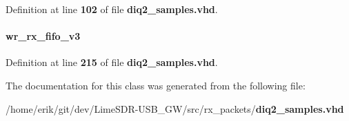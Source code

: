 Definition at line {\bf 102} of file {\bf diq2\+\_\+samples.\+vhd}.

\paragraph[{wr\+\_\+rx\+\_\+fifo\+\_\+v3\+\_\+inst}]{ {\bfseries \textcolor{vhdlchar}{wr\+\_\+rx\+\_\+fifo\+\_\+v3}\textcolor{vhdlchar}{ }} \hspace{0.3cm}{\ttfamily [Instantiation]}}\label{classdiq2__samples_1_1arch_a92be4319f2c228c51fdb72a4d8b96980}


Definition at line {\bf 215} of file {\bf diq2\+\_\+samples.\+vhd}.



The documentation for this class was generated from the following file\+:\begin{DoxyCompactItemize}
\item 
/home/erik/git/dev/\+Lime\+S\+D\+R-\/\+U\+S\+B\+\_\+\+G\+W/src/rx\+\_\+packets/{\bf diq2\+\_\+samples.\+vhd}\end{DoxyCompactItemize}
